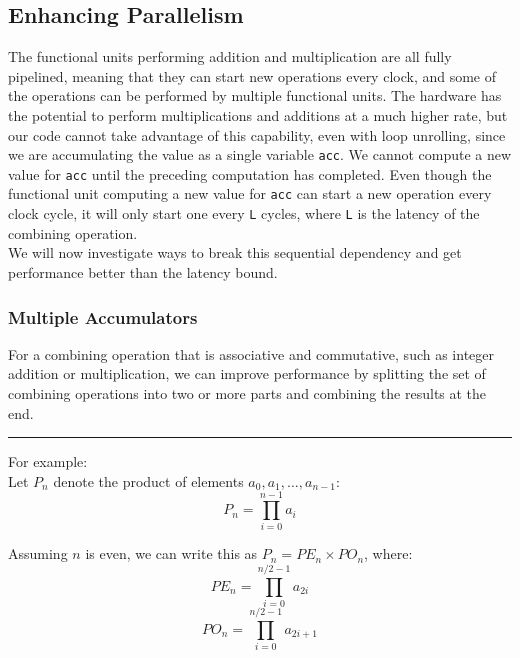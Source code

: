 \documentclass[11pt]{article}
\begin{document}
\subsection{Enhancing Parallelism}
\label{sec:orgbebf36c}
The functional units performing addition and multiplication are all fully pipelined, meaning that they can start new operations every clock, and some of the operations can be performed by multiple functional units. The hardware has the potential to perform multiplications and additions at a much higher rate, but our code cannot take advantage of this capability, even with loop unrolling, since we are accumulating the value as a single variable \texttt{acc}. We cannot compute a new value for \texttt{acc} until the preceding computation has completed. Even though the functional unit computing a new value for \texttt{acc} can start a new operation every clock cycle, it will only start one every \texttt{L} cycles, where \texttt{L} is the latency of the combining operation.\\

We will now investigate ways to break this sequential dependency and get performance better than the latency bound.\\

\subsubsection{Multiple Accumulators}
\label{sec:org931c91e}

For a combining operation that is associative and commutative, such as integer addition or multiplication, we can improve performance by splitting the set of combining operations into two or more parts and combining the results at the end.\\

\noindent\rule{\textwidth}{0.5pt}
For example:\\
Let \(P_n\) denote the product of elements \(a_0, a_1, \dots, a_{n-1}\):\\
\begin{equation}
P_n = \prod_{i=0}^{n-1} a_i
\end{equation}

Assuming \(n\) is even, we can write this as \(P_n = PE_n \times PO_n\), where:\\
\begin{equation}
PE_n = \prod_{i=0}^{n/2-1} a_{2i}
\end{equation}
\begin{equation}
PO_n = \prod_{i=0}^{n/2-1} a_{2i+1}
\end{equation}
\end{document}
